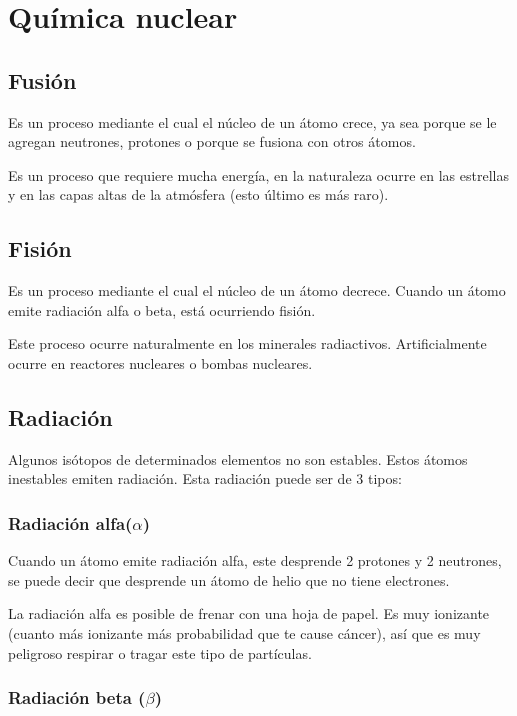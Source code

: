 
\section{Química nuclear}

\subsection*{Fusión}

Es un proceso mediante el cual el núcleo de un átomo crece, ya sea porque se le agregan neutrones, protones o porque se fusiona con otros átomos.

Es un proceso que requiere mucha energía, en la naturaleza ocurre en las estrellas y en las capas altas de la atmósfera (esto último es más raro).

\subsection*{Fisión}

Es un proceso mediante el cual el núcleo de un átomo decrece. Cuando un átomo emite radiación alfa o beta, está ocurriendo fisión. 

Este proceso ocurre naturalmente en los minerales radiactivos. Artificialmente ocurre en reactores nucleares o bombas nucleares.

\subsection*{Radiación}

Algunos isótopos de determinados elementos no son estables. Estos átomos inestables emiten radiación. Esta radiación puede ser de 3 tipos:

\subsubsection*{Radiación alfa($\alpha$)}

Cuando un átomo emite radiación alfa, este desprende 2 protones y 2 neutrones, se puede decir que desprende un átomo de helio que no tiene electrones.

\vspace{0.2cm}
La radiación alfa es posible de frenar con una hoja de papel. Es muy ionizante (cuanto más ionizante más probabilidad que te cause cáncer), así que es muy peligroso respirar o tragar este tipo de partículas.

\subsubsection*{Radiación beta ($\beta$)}

